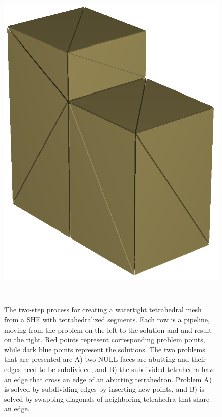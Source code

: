 \begin{figure}[t]
\begin{minipage}{0.9\linewidth}
\begin{minipage}{0.25\textwidth}
\includegraphics[width=\textwidth]{images/TetraMesh_AfterSubdivision_AndSwapping_crop.png}
\end{minipage}
\\
\end{minipage}
\caption[Two-step process for creating a watertight tetrahedral mesh from a SHF with tetrahedralized segments]
{\label{figure:TwoStepTetraProcess} The two-step process for creating a watertight tetrahedral mesh from a SHF with tetrahedralized segments. Each row is a pipeline, moving from the problem on the left to the solution and and result on the right. Red points represent corresponding problem points, while dark blue points represent the solutions. The two problems that are presented are A) two NULL faces are abutting and their edges need to be subdivided, and B) the subdivided tetrahedra have an edge that cross an edge of an abutting tetrahedron. Problem A) is solved by subdividing edges by inserting new points, and B) is solved by swapping diagonals of neighboring tetrahedra that share an edge.}
\end{figure}

